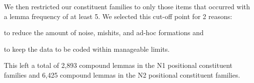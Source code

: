 We then restricted our constituent families to only those items that
occurred with a lemma frequency of at least 5. We selected this
cut-off point for 2 reasons:
\begin{inparaenum}[(1)]
\item to reduce the amount of noise,
mishits, and ad-hoc formations and 
\item to keep the data to be coded within
manageable limits.
\end{inparaenum}
This left a total of 2,893 compound lemmas in the
N1 positional constituent families and 6,425 compound lemmas in the N2
positional constituent families. 



